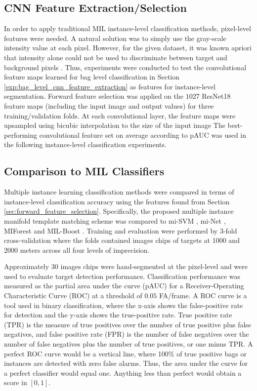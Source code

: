 \subsection{CNN Feature Extraction/Selection}
In order to apply traditional MIL instance-level classification methods, pixel-level features were needed.  A natural solution was to simply use the gray-scale intensity value at each pixel.  However, for the given dataset, it was known apriori that intensity alone could not be used to discriminate between target and background pixels \citep{Mahalanobis2019DSIACCharacterization, Tanner2019DSIACNeuralNet}.  Thus, experiments were conducted to test the convolutional feature maps learned for bag level classification in Section \ref{exp:bag_level_cnn_feature_extraction} as features for instance-level segmentation.  Forward feature selection was applied on the $1027$ ResNet18 feature maps (including the input image and output values) for three training/validation folds.  At each convolutional layer, the feature maps were upsampled  using bicubic interpolation to the size of the input image  The best-performing convolutional feature set on average according to pAUC was used in the following instance-level classification experiments. 

\subsection{Comparison to MIL Classifiers}
Multiple instance learning classification methods were compared in terms of instance-level classification accuracy using the features found from Section \ref{sec:forward_feature_selection}.  Specifically, the proposed multiple instance manifold template matching scheme was compared to mi-SVM \citep{Andrews2011MISVM}
, mi-Net \citep{Ramon2000miNet,Zhou2002miNet}, MIForest \citep{Leistner2010MIForests} and MIL-Boost \citep{Zhang2006MIBoosting}.  Training and evaluation were performed by 3-fold cross-validation where the folds contained images chips of targets at 1000 and 2000 meters across all four levels of imprecision. 

Approximately 30 images chips were hand-segmented at the pixel-level and were used to evaluate target detection performance. Classification performance was measured as the partial area under the curve (pAUC) for a Receiver-Operating Characteristic Curve (ROC) at a threshold of $0.05$ FA/frame.  A ROC curve is a tool used in binary classification, where the x-axis shows the false-positive rate for detection and the y-axis shows the true-positive rate.  True positive rate (TPR) is the measure of true positives over the number of true positive plus false negatives, and false positive rate (FPR) is the number of false negatives over the number of false negatives plus the number of true positives, or one minus TPR.  A perfect ROC curve would be a vertical line, where 100\% of true positive bags or instances are detected with zero false alarms.  Thus, the area under the curve for a perfect classifier would equal one.  Anything less than perfect would obtain a score in $[0,1]$.

